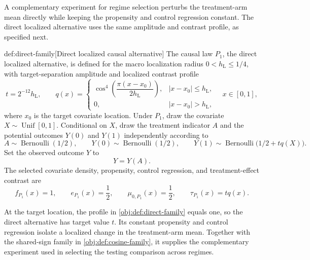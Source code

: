 A complementary experiment for regime selection perturbs the treatment-arm mean directly while keeping the propensity and control regression constant. The direct localized alternative  uses the same amplitude and contrast profile, as specified next.

\begin{definitionv}{def:direct-family}[Direct localized causal alternative]
The causal law \(P_1\), the direct localized alternative, is defined for the macro localization radius \(0<h_{\mathrm L}\le 1/4\), with target-separation amplitude and localized contrast profile
\[
t=2^{-12}h_{\mathrm L},
\qquad
q(x)=
\begin{cases}
\cos^4\!\left(\dfrac{\pi(x-x_0)}{2h_{\mathrm L}}\right),
& |x-x_0|\le h_{\mathrm L},\\
0,& |x-x_0|>h_{\mathrm L},
\end{cases}
\quad x\in[0,1],
\]
where \(x_0\) is the target covariate location. Under \(P_1\), draw the covariate \(X\sim\operatorname{Unif}[0,1]\). Conditional on \(X\), draw the treatment indicator \(A\) and the potential outcomes \(Y(0)\) and \(Y(1)\) independently according to
\[
A\sim\operatorname{Bernoulli}(1/2),
\qquad
Y(0)\sim\operatorname{Bernoulli}(1/2),
\qquad
Y(1)\sim\operatorname{Bernoulli}\bigl(1/2+tq(X)\bigr).
\]
Set the observed outcome \(Y\) to
\[
Y=Y(A).
\]
The selected covariate density, propensity, control regression, and treatment-effect contrast are
\[
f_{P_1}(x)=1,\qquad
e_{P_1}(x)=\frac12,\qquad
\mu_{0,P_1}(x)=\frac12,\qquad
\tau_{P_1}(x)=tq(x).
\]
\end{definitionv}

At the target location, the profile in \cref{obj:def:direct-family} equals one, so the direct alternative has target value \(t\). Its constant propensity and control regression isolate a localized change in the treatment-arm mean. Together with the shared-sign family in \cref{obj:def:cosine-family}, it supplies the complementary experiment used in selecting the testing comparison across regimes.
